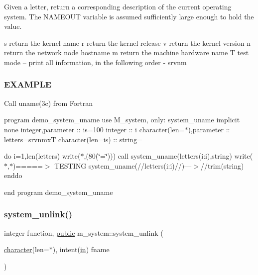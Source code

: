 Given a letter, return a corresponding description of the current operating system. The N\+A\+M\+E\+O\+UT variable is assumed sufficiently large enough to hold the value.

s return the kernel name r return the kernel release v return the kernel version n return the network node hostname m return the machine hardware name T test mode -- print all information, in the following order -\/ srvnm

\subsubsection*{E\+X\+A\+M\+P\+LE}

Call uname(3c) from Fortran

program demo\+\_\+system\+\_\+uname use M\+\_\+system, only\+: system\+\_\+uname implicit none integer,parameter \+:\+: is=100 integer \+:\+: i character(len=$\ast$),parameter \+:\+: letters=\textquotesingle{}srvnmxT\textquotesingle{} character(len=is) \+:\+: string=\textquotesingle{} \textquotesingle{}

do i=1,len(letters) write($\ast$,\textquotesingle{}(80(\char`\"{}=\char`\"{}))\textquotesingle{}) call system\+\_\+uname(letters(i\+:i),string) write($\ast$,$\ast$)\textquotesingle{}=====$>$ T\+E\+S\+T\+I\+NG system\+\_\+uname(\textquotesingle{}//letters(i\+:i)//\textquotesingle{})---$>$\textquotesingle{}//trim(string) enddo

end program demo\+\_\+system\+\_\+uname \mbox{\label{namespacem__system_a14ce0b9177815bc357dbdf3778687bb7}} 
\subsubsection{\texorpdfstring{system\+\_\+unlink()}{system\_unlink()}}
{\footnotesize\ttfamily integer function, \hyperlink{M__stopwatch_83_8txt_a2f74811300c361e53b430611a7d1769f}{public} m\+\_\+system\+::system\+\_\+unlink (\begin{DoxyParamCaption}\item[{\hyperlink{option__stopwatch_83_8txt_abd4b21fbbd175834027b5224bfe97e66}{character}(len=$\ast$), intent(\hyperlink{M__journal_83_8txt_afce72651d1eed785a2132bee863b2f38}{in})}]{fname }\end{DoxyParamCaption})}



